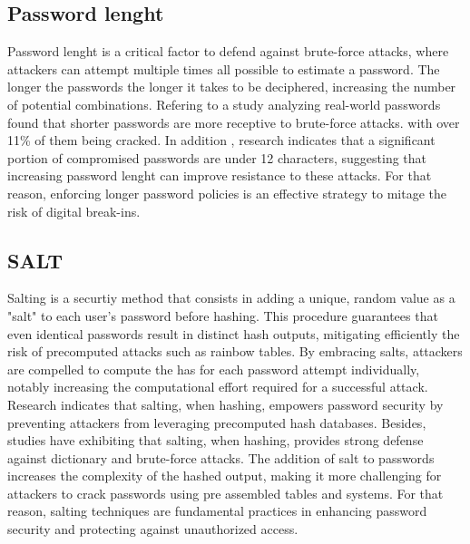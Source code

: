 \documentclass{comjnl}
\begin{document}
\subsection{Password lenght}
Password lenght is a critical factor to defend against brute-force attacks, where attackers can attempt multiple times all possible to estimate a password. The longer the passwords the longer it takes to be deciphered, increasing the number of potential combinations. Refering to a study analyzing real-world passwords found that shorter passwords are more receptive to brute-force attacks. with over 11\% of them being cracked. \cite{password_lenght} In addition , research indicates that a significant portion of compromised passwords are under 12 characters, suggesting that increasing password lenght can improve resistance to these attacks. \cite{specops} For that reason, enforcing longer password policies is an effective strategy to mitage the risk of digital break-ins. 

\subsection{SALT}
Salting is a securtiy method that consists in adding a unique, random value as a "salt" to each user's password before hashing. This procedure guarantees that even identical passwords result in distinct hash outputs, mitigating efficiently the risk of precomputed attacks such as rainbow tables. By embracing salts, attackers are compelled to compute the has for each password attempt individually, notably increasing the computational effort required for a successful attack. Research indicates that salting, when hashing, empowers password security by preventing attackers from leveraging precomputed hash databases. \cite{salting_description} Besides, studies have exhibiting that salting, when hashing, provides strong defense against dictionary and brute-force attacks. The addition of salt to passwords increases the complexity of the hashed output, making it more challenging for attackers to crack passwords using pre assembled tables and systems. \cite{salting_algo} For that reason, salting techniques are fundamental practices in enhancing password security and protecting against unauthorized access.
\end{document}
